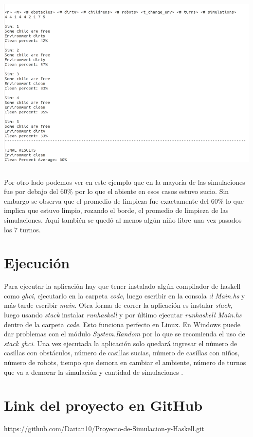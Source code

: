 \documentclass[a4paper,10pt]{article}
\begin{document}
\includegraphics[width=15cm, height=10cm]{img/dirty.png}\\   

 Por otro lado podemos ver en este ejemplo que en la mayor\'ia de las simulaciones fue por debajo del 60\% por lo que el abiente en esos casos estuvo sucio. Sin embargo se observa que el promedio de limpieza fue exactamente del 60\% lo que implica que estuvo limpio, rozando el borde, el promedio de limpieza de las simulaciones. Aqu\'i tambi\'en se qued\'o al menos alg\'un ni\~no libre una vez pasados los 7 turnos.
 
\section*{Ejecuci\'on}
Para ejecutar la aplicaci\'on hay que tener instalado alg\'un compilador de haskell como \textit{ghci}, ejecutarlo en la carpeta \textit{code}, luego escribir en la consola \textit {:l Main.hs} y m\'as tarde escribir \textit{main}. Otra forma de correr la aplicaci\'on es instalar \textit{stack}, luego usando \textit{stack} instalar \textit{runhaskell} y por \'ultimo ejecutar \textit{runhaskell Main.hs} dentro de la carpeta \textit{code}. Esto funciona perfecto en Linux. En Windows puede dar problemas con el m\'odulo \textit{System.Random} por lo que se recomienda el uso de \textit{stack ghci}.
Una vez ejecutada la aplicaci\'on solo quedar\'a ingresar el n\'umero de casillas con obst\'aculos, n\'umero de casillas sucias, n\'umero de casillas con ni\~nos, n\'umero de robots, tiempo que demora en cambiar el ambiente, n\'umero de turnos que va a demorar la simulaci\'on y cantidad de simulaciones . 

\section*{Link del proyecto en GitHub}
https://github.com/Darian10/Proyecto-de-Simulacion-y-Haskell.git

\end{document}

